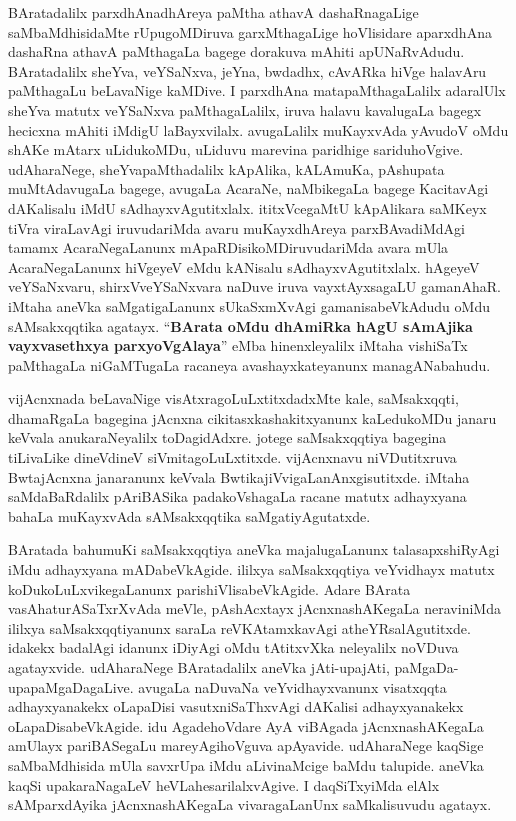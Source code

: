 \medskip

BAratadalilx parxdhAnadhAreya paMtha athavA dashaRnagaLige saMbaMdhisidaMte rUpugoMDiruva garxMthagaLige hoVlisidare \hbox{aparxdhAna} dashaRna athavA paMthagaLa bagege dorakuva mAhiti apUNaRvAdudu. BAratadalilx sheYva, veYSaNxva, jeYna, bwdadhx, cAvARka hiVge halavAru paMthagaLu beLavaNige kaMDive. I parxdhAna matapaMthagaLalilx adaralUlx sheYva matutx veYSaNxva paMthagaLalilx, iruva halavu kavalu\-gaLa bagegx hecicxna mAhiti iMdigU laBayxvilalx. avugaLalilx muKayxvAda yAvudoV oMdu shAKe mAtarx  uLidukoMDu, uLiduvu marevina paridhige sariduhoVgive. udAharaNege, sheYvapaMthadalilx kApAlika, kALAmuKa, pAshupata muMtAdavugaLa bagege, avugaLa AcaraNe, naMbikegaLa bagege KacitavAgi dAKalisalu iMdU sAdhayxvAgutitxlalx. ititxVcegaMtU kApAlikara saMKeyx tiVra viraLa\-vAgi iruvudariMda avaru muKayxdhAreya parxBAvadiMdAgi tamamx AcaraNegaLanunx mApaRDisikoMDiruvudariMda avara mUla AcaraNegaLanunx hiVgeyeV eMdu kANisalu sAdhayxvAgutitxlalx. hAgeyeV veYSaNxvaru, shirxVveYSaNxvara naDuve iruva vayxtAyxsagaLU gamanAhaR. iMtaha aneVka saMgatigaLanunx sUkaSxmXvAgi gamanisabeVkAdudu oMdu sAMsakxqqtika agatayx. ``\textbf{BArata oMdu dhAmiRka hAgU sAmAjika vayxvasethxya parxyoVgAlaya}'' eMba hinenxleyalilx iMtaha vishiSaTx paMthagaLa niGaMTugaLa racaneya avashayxkateyanunx managANa\-bahudu. 

\medskip

vijAcnxnada beLavaNige visAtxragoLuLxtitxdadxMte kale, saMsakxqqti, dhamaRgaLa bagegina jAcnxna cikitasxkashakitxyanunx kaLedukoMDu janaru keVvala anukaraNeyalilx toDagidAdxre. jotege saMsakxqqtiya bagegina tiLivaLike dineVdineV siVmitagoLuLxtitxde. vijAcnxnavu niVDutitxruva BwtajAcnxna janaranunx keVvala BwtikajiVvigaLanAnxgisutitxde. iMtaha saMdaBaRdalilx pAriBASika padakoVshagaLa racane matutx adhayxyana bahaLa muKayxvAda sAMsakxqqtika saMgatiyAgutatxde.

\eject

BAratada bahumuKi saMsakxqqtiya aneVka majalugaLanunx talasapxshiRyAgi iMdu adhayxyana mADabeVkAgide. ililxya saMsakxqqtiya veYvidhayx matutx koDukoLuLxvikegaLanunx parishiVlisabeVkAgide. Adare BArata vasAhaturASaTxrXvAda meVle, pAshAcxtayx jAcnxnashAKegaLa nera\-viniMda ililxya saMsakxqqtiyanunx saraLa reVKAtamxkavAgi atheYRsalAgutitxde. idakekx badalAgi idanunx iDiyAgi oMdu tAtitxvXka neleyalilx noVDuva agatayxvide. udAharaNege BAratadalilx aneVka jAti-upajAti, paMgaDa-upapaMgaDagaLive. avugaLa naDuvaNa veYvidhayx\-vanunx visatxqqta adhayxyanakekx oLapaDisi vasutxniSaThxvAgi dAKalisi adhayxyanakekx oLapaDisabeVkAgide. idu AgadehoVdare AyA \hbox{viBAgada} jAcnxnashAKegaLa amUlayx pariBASegaLu mareyAgihoVguva apAyavide. udAharaNege kaqSige saMbaMdhisida mUla savxrUpa iMdu aLivinaMcige baMdu talupide. aneVka kaqSi upakaraNagaLeV heVLahesarilalx\-vAgive. I daqSiTxyiMda elAlx sAMparx\-dAyika jAcnxnashAKegaLa vivaragaLanUnx saMkalisuvudu agatayx. 

